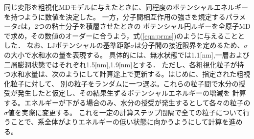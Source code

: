 ﻿\documentclass[11pt,a4j]{jarticle}
\begin{document}
同じ変形を粗視化MDモデルに与えたときに、同程度のポテンシャルエネルギーを持つように数値を決定した。
一方，分子間相互作用の強さを規定するパラメータ$\varepsilon$は，2つの粘土分子を積層させたときの
ポテンシャル円ルギーを全原子MDで求め，その数値のオーダーに合うよう，式(\ref{eqn:prms})のように与えることとした．
なお、LJポテンシャルの基準距離$\sigma$は分子間の接近限界を定めるため、$\sigma$の大小で水和水の量を表現する。
具体的には、無水状態では1.1[nm],一層および二層膨潤状態ではそれぞれ1.5[nm],1.9[nm]とする．
ただし、各粗視化粒子が持つ水和水量は、次のようにして計算途上で更新する。はじめに、指定された粗視化粒子に対して、
別の粒子をランダムに一つ選ぶ。これらの粒子間で水分の授受が発生したと仮定し、その結果生ずるポテンシャルエネルギーの増減を
計算する。エネルギーが下がる場合のみ、水分の授受が発生するとして各々の粒子の$\sigma$値を実際に変更する。
これを一定の計算ステップ間隔で全ての粒子について行うことで、系全体がよりエネルギーの低い状態に向かうようにして計算を進める。
\end{document}
